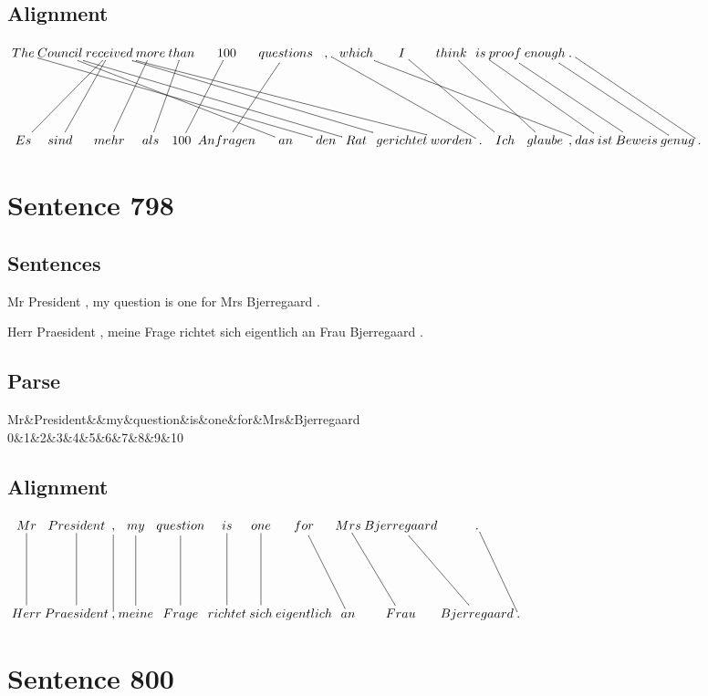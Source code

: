 \documentclass{report}
\begin{document}
\subsection*{Alignment}
\scriptsize{
$
\xymatrix@C-2.3pc{
The \ar @{-} [ddrrrrrrr] & Council \ar @{-} [ddrrrrrrr] \ar @{-} [ddrrrrr] & received \ar @{-} [ddrrrrrrr] \ar @{-} [ddrrrrrrrr] \ar @{-} [ddll] \ar @{-} [ddl] & more \ar @{-} [ddl] & than \ar @{-} [ddl] & 100 \ar @{-} [ddl] & questions \ar @{-} [ddl] & , \ar @{-} [ddrrrr] & which \ar @{-} [ddrrrrrrr] & I \ar @{-} [ddrrr] & think \ar @{-} [ddrrr] & is \ar @{-} [ddrrrrr] & proof \ar @{-} [ddrrrrr] & enough \ar @{-} [ddrrrrr] & . \ar @{-} [ddrrrrr]\\\\
Es & sind & mehr & als & 100 & Anfragen & an & den & Rat & gerichtet & worden & . & Ich & glaube & , & das & ist & Beweis & genug & .
}$}
\newpage\section*{Sentence 798}

\subsection*{Sentences}
Mr President , my question is one for Mrs Bjerregaard .

\noindent Herr Praesident , meine Frage richtet sich eigentlich an Frau Bjerregaard .



\subsection*{Parse}
\begin{dependency}[theme=simple]
\begin{deptext}[column sep=.5cm, row sep=.1ex]
Mr\&President\&\&my\&question\&is\&one\&for\&Mrs\&Bjerregaard\\
0\&1\&2\&3\&4\&5\&6\&7\&8\&9\&10\\
\end{deptext}
\end{dependency}


\subsection*{Alignment}
\scriptsize{
$
\xymatrix@C-2.3pc{
Mr \ar @{-} [dd] & President \ar @{-} [dd] & , \ar @{-} [dd] & my \ar @{-} [dd] & question \ar @{-} [dd] & is \ar @{-} [dd] & one \ar @{-} [dd] & for \ar @{-} [ddr] & Mrs \ar @{-} [ddr] & Bjerregaard \ar @{-} [ddr] & . \ar @{-} [ddr]\\\\
Herr & Praesident & , & meine & Frage & richtet & sich & eigentlich & an & Frau & Bjerregaard & .
}$}
\newpage\section*{Sentence 800}
\end{document}
